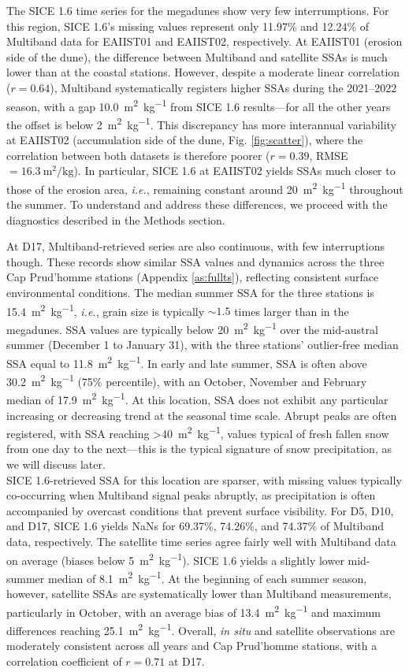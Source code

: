 \documentclass[11pt,a4paper]{article}
\newcommand{\ie}{\emph{i.e.}, }
\newcommand{\ssaunit}{\meter\squared\per\kilo\gram}
\begin{document}
The SICE 1.6 time series for the megadunes show very few interrumptions. For this region, SICE 1.6's missing values represent only 11.97\% and 12.24\% of Multiband data for EAIIST01 and EAIIST02, respectively. At EAIIST01 (erosion side of the dune), the difference between Multiband and satellite SSAs is much lower than at the coastal stations. However, despite a moderate linear correlation ($r = 0.64$), Multiband systematically registers higher SSAs during the 2021--2022 season, with a gap \qty{10.0}{\ssaunit} from SICE 1.6 results---for all the other years the offset is below \qty{2}{\ssaunit}. This discrepancy has more interannual variability at EAIIST02 (accumulation side of the dune, Fig. \ref{fig:scatter}), where the correlation between both datasets is therefore poorer ($r = 0.39$, RMSE$=\qty{16.3}{\ssaunit}$). In particular, SICE 1.6 at EAIIST02 yields SSAs much closer to those of the erosion area, \ie remaining constant around \qty{20}{\ssaunit} throughout the summer. To understand and address these differences, we proceed with the diagnostics described in the Methods section.

At D17, Multiband-retrieved series are also continuous, with few interruptions though. These records show similar SSA values and dynamics across the three Cap Prud'homme stations (Appendix \ref{as:fullts}), reflecting consistent surface environmental conditions. The median summer SSA for the three stations is \qty{15.4}{\ssaunit}, \ie grain size is typically $\sim 1.5$ times larger than in the megadunes. SSA values are typically below \qty{20}{\ssaunit} over the mid-austral summer (December 1 to January 31), with the three stations' outlier-free median SSA equal to \qty{11.8}{\ssaunit}. In early and late summer, SSA is often above \qty{30.2}{\ssaunit} (75\% percentile), with an October, November and February median of \qty{17.9}{\ssaunit}. At this location, SSA does not exhibit any particular increasing or decreasing trend at the seasonal time scale. Abrupt peaks are often registered, with SSA reaching >\qty{40}{\ssaunit}, values typical of fresh fallen snow from one day to the next---this is the typical signature of snow precipitation, as we will discuss later.\\
SICE 1.6-retrieved SSA for this location are sparser, with missing values typically co-occurring when Multiband signal peaks abruptly, as precipitation is often accompanied by overcast conditions that prevent surface visibility. For D5, D10, and D17, SICE 1.6 yields NaNs for 69.37\%, 74.26\%, and 74.37\% of Multiband data, respectively.
The satellite time series agree fairly well with Multiband data on average (biases below \qty{5}{\ssaunit}). SICE 1.6 yields a slightly lower mid-summer median of \qty{8.1}{\ssaunit}. At the beginning of each summer season, however, satellite SSAs are systematically lower than Multiband measurements, particularly in October, with an average bias of \qty{13.4}{\ssaunit} and maximum differences reaching \qty{25.1}{\ssaunit}. Overall, \emph{in situ} and satellite observations are moderately consistent across all years and Cap Prud'homme stations, with a correlation coefficient of $r=0.71$ at D17.
\end{document}
